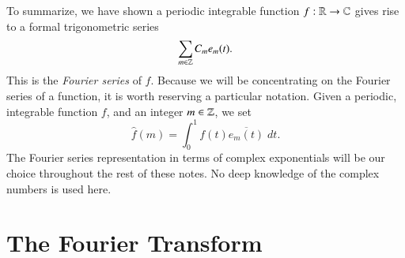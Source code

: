 To summarize, we have shown a periodic integrable function $f: \operatorname{\mathbb{R}} \to \operatorname{\mathbb{C}}$ gives rise to a formal trigonometric series
%
\[ \sum_{m \in \operatorname{\mathbb{Z}}} C_m e_m(t). \]
%
This is the \emph{Fourier series} of $f$. Because we will be concentrating on the Fourier series of a function, it is worth reserving a particular notation. Given a periodic, integrable function $f$, and an integer $m \in \operatorname{\mathbb{Z}}$, we set
%
\[ \widehat{f}(m) = \int_0^1 f(t) \overline{e_m(t)}\; dt. \]
%
The Fourier series representation in terms of complex exponentials will be our choice throughout the rest of these notes. No deep knowledge of the complex numbers is used here.

\section{The Fourier Transform}

